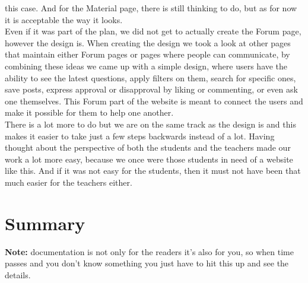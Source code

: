 \documentclass[12pt,a4paper]{article}
\begin{document}
\begin{spacing}{1.5}
    this case. And for the Material page, there is still thinking to do, but as for
    now it is acceptable the way it looks. \\ \indent Even if it was part of the
    plan, we did not get to actually create the Forum page, however the design is.
    When creating the design we took a look at other pages that maintain either
    Forum pages or pages where people can communicate, by combining these ideas we
    came up with a simple design, where users have the ability to see the latest
    questions, apply filters on them, search for specific ones, save posts, express
    approval or disapproval by liking or commenting, or even ask one themselves.
    This Forum part of the website is meant to connect the users and make it
    possible for them to help one another. \\ \indent There is a lot more to do but
    we are on the same track as the design is and this makes it easier to take just
    a few steps backwards instead of a lot. Having thought about the perspective of
    both the students and the teachers made our work a lot more easy, because we
    once were those students in need of a website like this. And if it was not easy
    for the students, then it must not have been that much easier for the teachers
    either.

    \section{Summary}

    \textbf{Note:} documentation is not only for the readers it's also for you, so when time
    passes and you don't know something you just have to hit this up and see the
    details.


\end{spacing}
\end{document}
